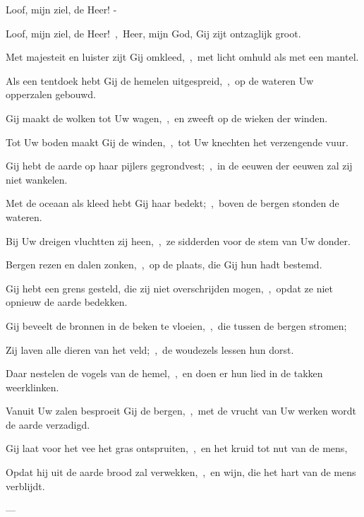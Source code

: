 \documentclass[12pt,twoside,a5paper]{article}
\begin{document}
\begin{halfparskip}
   Loof, mijn ziel, de Heer! - 

  Loof, mijn ziel, de Heer!~\sep\ Heer, mijn God, Gij zijt ontzaglijk groot.

  Met majesteit en luister zijt Gij omkleed,~\sep\ met licht omhuld als met een mantel.

  Als een tentdoek hebt Gij de hemelen uitgespreid,~\sep\ op de wateren Uw opperzalen gebouwd.

  Gij maakt de wolken tot Uw wagen,~\sep\ en zweeft op de wieken der winden.

  Tot Uw boden maakt Gij de winden,~\sep\ tot Uw knechten het verzengende vuur.

  Gij hebt de aarde op haar pijlers gegrondvest;~\sep\ in de eeuwen der eeuwen zal zij niet wankelen.

  Met de oceaan als kleed hebt Gij haar bedekt;~\sep\ boven de bergen stonden de wateren.

  Bij Uw dreigen vluchtten zij heen,~\sep\ ze sidderden voor de stem van Uw donder.

  Bergen rezen en dalen zonken,~\sep\ op de plaats, die Gij hun hadt bestemd.

  Gij hebt een grens gesteld, die zij niet overschrijden mogen,~\sep\ opdat ze niet opnieuw de aarde bedekken.

  Gij beveelt de bronnen in de beken te vloeien,~\sep\ die tussen de bergen stromen;

  Zij laven alle dieren van het veld;~\sep\ de woudezels lessen hun dorst.

  Daar nestelen de vogels van de hemel,~\sep\ en doen er hun lied in de takken weerklinken.

  Vanuit Uw zalen besproeit Gij de bergen,~\sep\ met de vrucht van Uw werken wordt de aarde verzadigd.

  Gij laat voor het vee het gras ontspruiten,~\sep\ en het kruid tot nut van de mens,

  Opdat hij uit de aarde brood zal verwekken,~\sep\ en wijn, die het hart van de mens verblijdt.

   --- 
\end{halfparskip}
\end{document}
